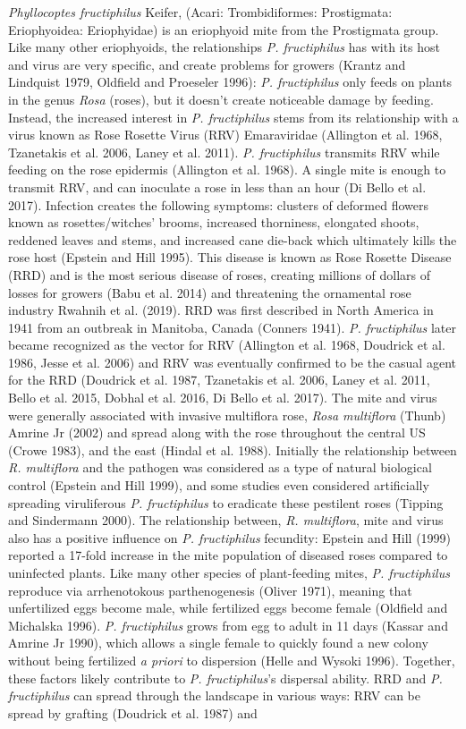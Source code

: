 \documentclass[12pt,final,CPage]{ufthesis}
\begin{document}
{  \emph{Phyllocoptes fructiphilus} Keifer, (Acari: Trombidiformes: Prostigmata: Eriophyoidea: Eriophyidae) is an eriophyoid mite from the Prostigmata group. Like many other eriophyoids, the relationships \emph{P. fructiphilus} has with its host and virus are very specific, and create problems for growers (Krantz and Lindquist 1979, Oldfield and Proeseler 1996): \emph{P. fructiphilus} only feeds on plants in the genus \emph{Rosa} (roses), but it doesn't create noticeable damage by feeding. Instead, the increased interest in \emph{P. fructiphilus} stems from its relationship with a virus known as Rose Rosette Virus (RRV) Emaraviridae (Allington et al. 1968, Tzanetakis et al. 2006, Laney et al. 2011). \emph{P. fructiphilus} transmits RRV while feeding on the rose epidermis (Allington et al. 1968). A single mite is enough to transmit RRV, and can inoculate a rose in less than an hour (Di Bello et al. 2017). Infection creates the following symptoms: clusters of deformed flowers known as rosettes/witches' brooms, increased thorniness, elongated shoots, reddened leaves and stems, and increased cane die-back which ultimately kills the rose host (Epstein and Hill 1995). This disease is known as Rose Rosette Disease (RRD) and is the most serious disease of roses, creating millions of dollars of losses for growers (Babu et al. 2014) and threatening the ornamental rose industry Rwahnih et al. (2019). RRD was first described in North America in 1941 from an outbreak in Manitoba, Canada (Conners 1941). \emph{P. fructiphilus} later became recognized as the vector for RRV (Allington et al. 1968, Doudrick et al. 1986, Jesse et al. 2006) and RRV was eventually confirmed to be the casual agent for the RRD (Doudrick et al. 1987, Tzanetakis et al. 2006, Laney et al. 2011, Bello et al. 2015, Dobhal et al. 2016, Di Bello et al. 2017). The mite and virus were generally associated with invasive multiflora rose, \emph{Rosa multiflora} (Thunb) Amrine Jr (2002) and spread along with the rose throughout the central US (Crowe 1983), and the east (Hindal et al. 1988). Initially the relationship between \emph{R. multiflora} and the pathogen was considered as a type of natural biological control (Epstein and Hill 1999), and some studies even considered artificially spreading viruliferous \emph{P. fructiphilus} to eradicate these pestilent roses (Tipping and Sindermann 2000). The relationship between, \emph{R. multiflora}, mite and virus also has a positive influence on \emph{P. fructiphilus} fecundity: Epstein and Hill (1999) reported a 17-fold increase in the mite population of diseased roses compared to uninfected plants. Like many other species of plant-feeding mites, \emph{P. fructiphilus} reproduce via arrhenotokous parthenogenesis (Oliver 1971), meaning that unfertilized eggs become male, while fertilized eggs become female (Oldfield and Michalska 1996). \emph{P. fructiphilus} grows from egg to adult in 11 days (Kassar and Amrine Jr 1990), which allows a single female to quickly found a new colony without being fertilized \emph{a priori} to dispersion (Helle and Wysoki 1996). Together, these factors likely contribute to \emph{P. fructiphilus}'s dispersal ability. RRD and \emph{P. fructiphilus} can spread through the landscape in various ways: RRV can be spread by grafting (Doudrick et al. 1987) and }
\end{document}
